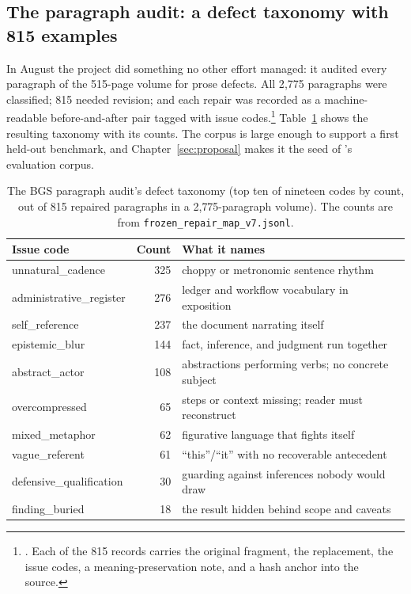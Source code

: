 \subsection{The paragraph audit: a defect taxonomy with 815 examples}
\label{sec:bgs-audit}

In August the project did something no other effort managed: it audited every
paragraph of the 515-page volume for prose defects. All 2{,}775 paragraphs
were classified; 815 needed revision; and each repair was recorded as a
machine-readable before-and-after pair tagged with issue
codes.\footnote{. Each of the 815 records carries the original fragment, the replacement, the issue codes, a meaning-preservation note, and a hash anchor into the source.}
Table~\ref{tab:bgs-taxonomy} shows the resulting taxonomy with its counts.
The corpus is large enough to support a first held-out benchmark, and
Chapter~\ref{sec:proposal} makes it the seed of \hv{}'s evaluation corpus.

\begin{table}[t]
\centering
\small
\begin{tabular}{@{}lrl@{}}
\toprule
Issue code & Count & What it names \\
\midrule
unnatural\_cadence & 325 & choppy or metronomic sentence rhythm \\
administrative\_register & 276 & ledger and workflow vocabulary in exposition \\
self\_reference & 237 & the document narrating itself \\
epistemic\_blur & 144 & fact, inference, and judgment run together \\
abstract\_actor & 108 & abstractions performing verbs; no concrete subject \\
overcompressed & 65 & steps or context missing; reader must reconstruct \\
mixed\_metaphor & 62 & figurative language that fights itself \\
vague\_referent & 61 & ``this''/``it'' with no recoverable antecedent \\
defensive\_qualification & 30 & guarding against inferences nobody would draw \\
finding\_buried & 18 & the result hidden behind scope and caveats \\
\bottomrule
\end{tabular}
\caption{The BGS paragraph audit's defect taxonomy (top ten of nineteen
codes by count, out of 815 repaired paragraphs in a 2{,}775-paragraph
volume). The counts are from \texttt{frozen\_repair\_map\_v7.jsonl}.}
\label{tab:bgs-taxonomy}
\end{table}

